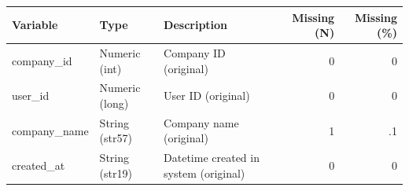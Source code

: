 \begin{threeparttable}


\begin{tabular}{@{}lllrr@{}}


\toprule


\textbf{Variable} & \textbf{Type} & \textbf{Description} & \textbf{Missing (N)} & \textbf{Missing (\%)} \\


\midrule


\midrule
company\_id & Numeric (int) & Company ID (original)&           0&           0\\
user\_id & Numeric (long) & User ID (original)&           0&           0\\
company\_name & String (str57) & Company name (original)&           1&          .1\\
created\_at & String (str19) & Datetime created in system (original)&           0&           0\\
\bottomrule


\end{tabular}


\end{threeparttable}
